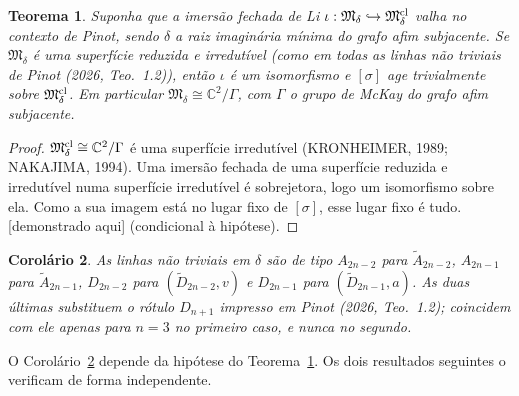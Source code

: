 \documentclass[11pt]{article}
\newtheorem{theorem}{Teorema}[section]
\newtheorem{corollary}[theorem]{Corolário}
\theoremstyle{definition}
\theoremstyle{remark}
\newcommand{\tagP}{\textsf{\small[demonstrado aqui]}}
\newcommand{\C}{\mathbb{C}}\newcommand{\R}{\mathbb{R}}\newcommand{\Z}{\mathbb{Z}}
\newcommand{\M}{\mathfrak{M}}\newcommand{\Rep}{\mathrm{Rep}}\newcommand{\SRep}{\mathrm{SRep}}
\begin{document}
\begin{theorem}\label{thm:A}
Suponha que a imersão fechada de Li $\iota:\M_\delta\hookrightarrow\M^{\rm cl}_\delta$ valha no contexto de Pinot, sendo $\delta$ a raiz imaginária mínima do grafo afim subjacente. Se $\M_\delta$ é uma superfície reduzida e irredutível (como em todas as linhas não triviais de Pinot (2026, Teo.~1.2)), então $\iota$ é um isomorfismo e $[\sigma]$ age trivialmente sobre $\M^{\rm cl}_\delta$. Em particular $\M_\delta\cong\C^2/\Gamma$, com $\Gamma$ o grupo de McKay do grafo afim subjacente.
\end{theorem}
\begin{proof}
$\M^{\rm cl}_\delta\cong\C^2/\Gamma$ é uma superfície irredutível (KRONHEIMER, 1989; NAKAJIMA, 1994). Uma imersão fechada de uma superfície reduzida e irredutível numa superfície irredutível é sobrejetora, logo um isomorfismo sobre ela. Como a sua imagem está no lugar fixo de $[\sigma]$, esse lugar fixo é tudo. \tagP{} (condicional à hipótese).
\end{proof}

\begin{corollary}\label{cor:B}
As linhas não triviais em $\delta$ são de tipo $A_{2n-2}$ para $\widetilde A_{2n-2}$, $A_{2n-1}$ para $\widetilde A_{2n-1}$, $D_{2n-2}$ para $(\widetilde D_{2n-2},v)$ e $D_{2n-1}$ para $(\widetilde D_{2n-1},a)$. As duas últimas substituem o rótulo $D_{n+1}$ impresso em Pinot (2026, Teo.~1.2); coincidem com ele apenas para $n=3$ no primeiro caso, e nunca no segundo.
\end{corollary}

O Corolário~\ref{cor:B} depende da hipótese do Teorema~\ref{thm:A}. Os dois resultados seguintes o verificam de forma independente.
\end{document}
